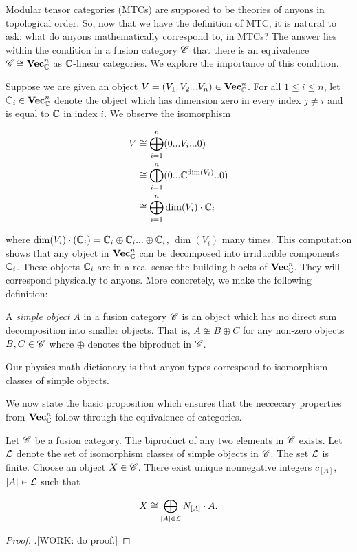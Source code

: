Modular tensor categories (MTCs) are supposed to be theories of anyons in topological order. So, now that we have the definition of MTC, it is natural to ask: what do anyons mathematically correspond to, in MTCs? The answer lies within the condition in a fusion category $\mathscr{C}$ that there is an equivalence $\mathscr{C}\cong \mathbf{Vec}_{\mathbb{C}}^n$ as $\mathbb{C}$-linear categories. We explore the importance of this condition.

Suppose we are given an object $V=(V_1,V_2...V_n)\in \mathbf{Vec}_{\mathbb{C}}^n$. For all $1\leq i\leq n$, let  $\mathbb{C}_i\in \mathbf{Vec}_{\mathbb{C}}^n$ denote the object which has dimension zero in every index $j\neq i$ and is equal to $\mathbb{C}$ in index $i$. We observe the isomorphism

\begin{align*}
V& \cong \bigoplus_{i=1}^n (0... V_i ... 0)\\
& \cong \bigoplus_{i=1}^n (0... \mathbb{C}^{\dim (V_i)}.. 0)\\
& \cong \bigoplus_{i=1}^n \dim(V_i)\cdot \mathbb{C}_i
\end{align*}

where $\dim(V_i)\cdot (\mathbb{C}_i)=\mathbb{C}_i\oplus \mathbb{C}_i...\oplus \mathbb{C}_i$, $\dim(V_i)$ many times. This computation shows that any object in $\mathbf{Vec}_{\mathbb{C}}^n$ can be decomposed into irriducible components $\mathbb{C}_i$. These objects $\mathbb{C}_i$ are in a real sense the building blocks of $\mathbf{Vec}_{\mathbb{C}}^n$. They will correspond physically to anyons. More concretely, we make the following definition:

\begin{definition} A \textit{simple object} $A$ in a fusion category $\mathscr{C}$ is an object which has no direct sum decomposition into smaller objects. That is, $A\ncong B\oplus C$ for any non-zero objects $B,C\in \mathscr{C}$ where $\oplus$ denotes the biproduct in $\mathscr{C}$.
\end{definition}

Our physics-math dictionary is that anyon types correspond to isomorphism classes of simple objects.

We now state the basic proposition which ensures that the neccecary properties from $\mathbf{Vec}_{\mathbb{C}}^n$ follow through the equivalence of categories.

\begin{proposition} Let $\mathscr{C}$ be a fusion category. The biproduct of any two elements in $\mathscr{C}$ exists. Let $\mathcal{L}$ denote the set of isomorphism classes of simple objects in $\mathscr{C}$. The set $\mathcal{L}$ is finite. Choose an object $X\in \mathscr{C}$. There exist unique nonnegative integers $c_{[A]}$, $[A]\in \mathcal{L}$ such that 

$$X\cong \bigoplus_{[A]\in \mathcal{L}}N_{[A]}\cdot A.$$
\end{proposition}
\begin{proof}.[WORK: do proof.]
\end{proof}

